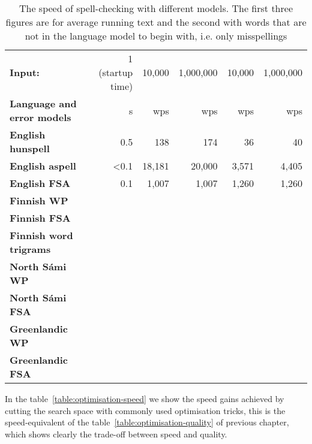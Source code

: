 \documentclass[a4paper,12pt]{article}
\begin{document}
\begin{table}
    \centering
    \begin{tabular}{|l|r||r|r|r|r|}
        \hline
        \bf Input: & 1 (startup time) & 10,000 & 1,000,000 & 10,000 & 1,000,000 \\
        \bf Language and error models & s & wps & wps & wps & wps \\
        \hline
        \bf English hunspell & 0.5 & 138 & 174 & 36 & 40 \\
          \bf English aspell & <0.1 & 18,181 & 20,000 & 3,571 & 4,405 \\

          \bf English FSA & 0.1 & 1,007 & 1,007 & 1,260 & 1,260 \\
        \hline
        \bf Finnish WP & & & & & \\
       \bf Finnish FSA & & & & & \\
        \bf Finnish word trigrams & & & & & \\
        \hline
        \bf North Sámi WP  & & & & & \\
        \bf North Sámi FSA & & & & & \\
        \hline
        \bf Greenlandic WP & & & & & \\
       \bf Greenlandic FSA & & & & & \\
        \hline
    \end{tabular}
    \caption{The speed of spell-checking with different models. The first three
    figures are for average running text and the second with words that are not
    in the language model to begin with, i.e. only
    misspellings\label{table:language-speed}}
\end{table}

In the table~\ref{table:optimisation-speed} we show the speed gains achieved by
cutting the search space with commonly used optimisation tricks, this is the
speed-equivalent of the table~\ref{table:optimisation-quality} of previous
chapter, which shows clearly the trade-off between speed and quality.
\end{document}
